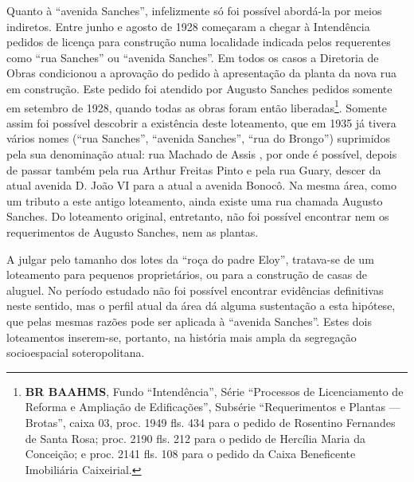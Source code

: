 Quanto à ``avenida Sanches'', infelizmente só foi possível abordá-la por meios indiretos. Entre junho e agosto de 1928 começaram a chegar à Intendência pedidos de licença para construção numa localidade indicada pelos requerentes como ``rua Sanches'' ou ``avenida Sanches''. Em todos os casos a Diretoria de Obras condicionou a aprovação do pedido à apresentação da planta da nova rua em construção. Este pedido foi atendido por Augusto Sanches pedidos somente em setembro de 1928, quando todas as obras foram então liberadas\footnote{\textbf{BR BAAHMS}, Fundo ``Intendência'', Série ``Processos de Licenciamento de Reforma e Ampliação de Edificações'', Subsérie ``Requerimentos e Plantas --- Brotas'', caixa 03, proc. 1949 fls. 434 para o pedido de Rosentino Fernandes de Santa Rosa; proc. 2190 fls. 212 para o pedido de Hercília Maria da Conceição; e proc. 2141 fls. 108 para o pedido da Caixa Beneficente Imobiliária Caixeirial.}. Somente assim foi possível descobrir a existência deste loteamento, que em 1935 já tivera vários nomes (``rua Sanches'', ``avenida Sanches'', ``rua do Brongo'') suprimidos pela sua denominação atual: rua Machado de Assis \cite[p.~84]{souza_guia_1935}, por onde é possível, depois de passar também pela rua Arthur Freitas Pinto e pela rua Guary, descer da atual avenida D. João VI para a atual a avenida Bonocô. Na mesma área, como um tributo a este antigo loteamento, ainda existe uma rua chamada Augusto Sanches. Do loteamento original, entretanto, não foi possível encontrar nem os requerimentos de Augusto Sanches, nem as plantas.

A julgar pelo tamanho dos lotes da ``roça do padre Eloy'', tratava-se de um loteamento para pequenos proprietários, ou para a construção de casas de aluguel. No período estudado não foi possível encontrar evidências definitivas neste sentido, mas o perfil atual da área dá alguma sustentação a esta hipótese, que pelas mesmas razões pode ser aplicada à ``avenida Sanches''. Estes dois loteamentos inserem-se, portanto, na história mais ampla da segregação socioespacial soteropolitana.

